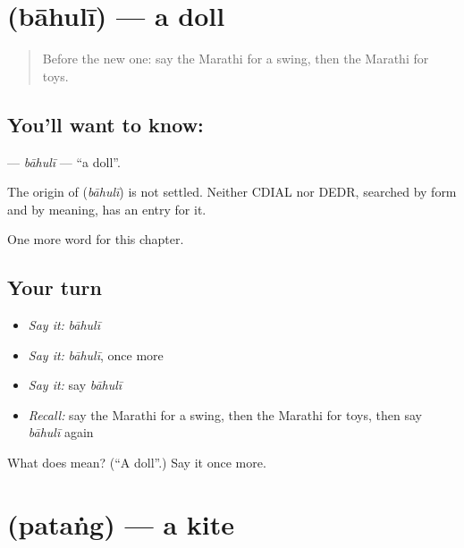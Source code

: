 \section[\texorpdfstring{\mr{बाहुली} (bāhulī)}{बाहुली (bāhulī)}]{ (bāhulī) — a doll}

\label{lesson:MR-C249-bahuli}



\begin{quote}
Before the new one: say the Marathi for a swing, then the Marathi for toys.
\end{quote}

\subsection*{You'll want to know: }
\textbf{} — \emph{bāhulī} — \textquotedblleft{}a doll\textquotedblright{}.

\begin{cousinweb}
The origin of \textbf{} (\emph{bāhulī}) is not settled. Neither CDIAL nor DEDR, searched by form and by meaning, has an entry for it.
\end{cousinweb}

\begin{grammarlens}[title={What you've built}]
One more word for this chapter.
\end{grammarlens}

\subsection*{Your turn}
\begin{itemize}
\raggedright
  \item \emph{Say it:} \emph{bāhulī}
  \item \emph{Say it:} \emph{bāhulī}, once more
  \item \emph{Say it:} say \emph{bāhulī}
  \item \emph{Recall:} say the Marathi for a swing, then the Marathi for toys, then say \emph{bāhulī} again
\end{itemize}

\begin{tcolorbox}[breakable,colback=teal!4,colframe=teal!35!black,title={Before you move on}]
What does  mean? (\textquotedblleft{}A doll\textquotedblright{}.) Say it once more.
\end{tcolorbox}
\section[\texorpdfstring{\mr{पतंग} (pataṅg)}{पतंग (pataṅg)}]{ (pataṅg) — a kite}

